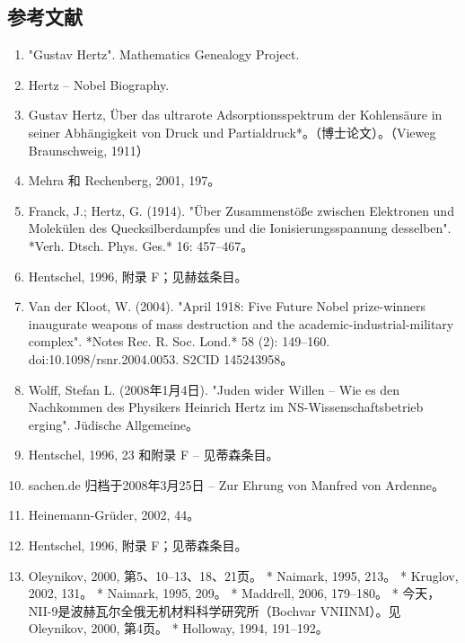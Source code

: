 \subsection{参考文献}
\begin{enumerate}
\item "Gustav Hertz". Mathematics Genealogy Project.
\item Hertz – Nobel Biography.
\item Gustav Hertz, Über das ultrarote Adsorptionsspektrum der Kohlensäure in seiner Abhängigkeit von Druck und Partialdruck*。（博士论文）。（Vieweg Braunschweig, 1911）
\item Mehra 和 Rechenberg, 2001, 197。
\item Franck, J.; Hertz, G. (1914). "Über Zusammenstöße zwischen Elektronen und Molekülen des Quecksilberdampfes und die Ionisierungsspannung desselben". *Verh. Dtsch. Phys. Ges.* 16: 457–467。
\item Hentschel, 1996, 附录 F；见赫兹条目。
\item Van der Kloot, W. (2004). "April 1918: Five Future Nobel prize-winners inaugurate weapons of mass destruction and the academic-industrial-military complex". *Notes Rec. R. Soc. Lond.* 58 (2): 149–160. doi:10.1098/rsnr.2004.0053. S2CID 145243958。
\item Wolff, Stefan L. (2008年1月4日). "Juden wider Willen – Wie es den Nachkommen des Physikers Heinrich Hertz im NS-Wissenschaftsbetrieb erging". Jüdische Allgemeine。
\item Hentschel, 1996, 23 和附录 F – 见蒂森条目。
\item sachen.de 归档于2008年3月25日 – Zur Ehrung von Manfred von Ardenne。
\item Heinemann-Grüder, 2002, 44。
\item Hentschel, 1996, 附录 F；见蒂森条目。
\item Oleynikov, 2000, 第5、10–13、18、21页。
* Naimark, 1995, 213。
* Kruglov, 2002, 131。
* Naimark, 1995, 209。
* Maddrell, 2006, 179–180。
* 今天，NII-9是波赫瓦尔全俄无机材料科学研究所（Bochvar VNIINM）。见 Oleynikov, 2000, 第4页。
* Holloway, 1994, 191–192。
\end{enumerate}
